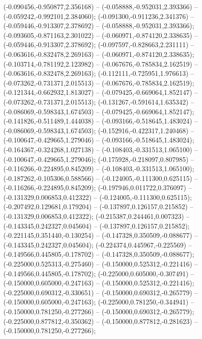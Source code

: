  (-0.090456,-0.950877,2.356168) -- (-0.058888,-0.952031,2.393366) -- (-0.059242,-0.992101,2.384060);
 (-0.091300,-0.911236,2.341376) -- (-0.059446,-0.913307,2.378692) -- (-0.058888,-0.952031,2.393366);
 (-0.093605,-0.871163,2.301022) -- (-0.060971,-0.874120,2.338635) -- (-0.059446,-0.913307,2.378692);
 (-0.097597,-0.828663,2.231111) -- (-0.063616,-0.832478,2.269163) -- (-0.060971,-0.874120,2.338635);
 (-0.103714,-0.781192,2.123982) -- (-0.067676,-0.785834,2.162519) -- (-0.063616,-0.832478,2.269163);
 (-0.112111,-0.725951,1.976613) -- (-0.073262,-0.731371,2.015513) -- (-0.067676,-0.785834,2.162519);
 (-0.121344,-0.662932,1.813027) -- (-0.079425,-0.669064,1.852147) -- (-0.073262,-0.731371,2.015513);
 (-0.131267,-0.591614,1.635342) -- (-0.086069,-0.598343,1.674503) -- (-0.079425,-0.669064,1.852147);
 (-0.141826,-0.511489,1.444038) -- (-0.093166,-0.518645,1.483024) -- (-0.086069,-0.598343,1.674503);
 (-0.152916,-0.422317,1.240468) -- (-0.100647,-0.429665,1.279046) -- (-0.093166,-0.518645,1.483024);
 (-0.164367,-0.324268,1.027138) -- (-0.108403,-0.331513,1.065100) -- (-0.100647,-0.429665,1.279046);
 (-0.175928,-0.218097,0.807985) -- (-0.116266,-0.224895,0.845209) -- (-0.108403,-0.331513,1.065100);
 (-0.187262,-0.105306,0.588566) -- (-0.124005,-0.111300,0.625115) -- (-0.116266,-0.224895,0.845209);
 (-0.197946,0.011722,0.376097) -- (-0.131329,0.006853,0.412322) -- (-0.124005,-0.111300,0.625115);
 (-0.207492,0.129681,0.179204) -- (-0.137897,0.126157,0.215852) -- (-0.131329,0.006853,0.412322);
 (-0.215387,0.244461,0.007323) -- (-0.143345,0.242327,0.045604) -- (-0.137897,0.126157,0.215852);
 (-0.221145,0.351440,-0.130254) -- (-0.147328,0.350509,-0.088677) -- (-0.143345,0.242327,0.045604);
 (-0.224374,0.445967,-0.225569) -- (-0.149566,0.445805,-0.178702) -- (-0.147328,0.350509,-0.088677);
 (-0.225000,0.525313,-0.275460) -- (-0.150000,0.525312,-0.221416) -- (-0.149566,0.445805,-0.178702);
 (-0.225000,0.605000,-0.307491) -- (-0.150000,0.605000,-0.247163) -- (-0.150000,0.525312,-0.221416);
 (-0.225000,0.690312,-0.330651) -- (-0.150000,0.690312,-0.265779) -- (-0.150000,0.605000,-0.247163);
 (-0.225000,0.781250,-0.344941) -- (-0.150000,0.781250,-0.277266) -- (-0.150000,0.690312,-0.265779);
 (-0.225000,0.877812,-0.350362) -- (-0.150000,0.877812,-0.281623) -- (-0.150000,0.781250,-0.277266);
